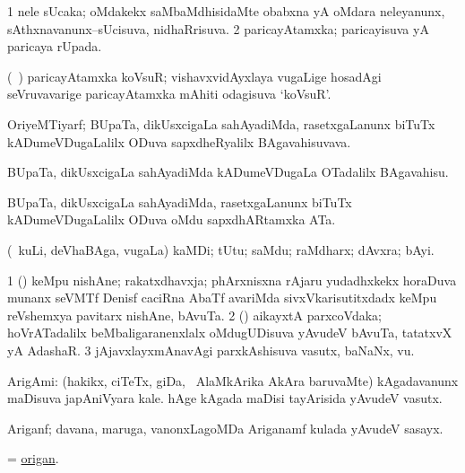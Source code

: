\bentry
{}
\gl{\gu}
\bmng
\bnum
\num{1} nele sUcaka; oMdakekx saMbaMdhisidaMte obabxna yA oMdara neleyanunx, sAthxnavanunx--sUcisuva, nidhaRrisuva. 
\num{2} paricayAtamxka; paricayisuva yA paricaya rUpada. 
\enum
\emng
\eentry

\bentry
{}
\gl{\nA}
\bmng
(\kanmu\ \ame) paricayAtamxka koVsuR; vishavxvidAyxlaya \mo vugaLige hosadAgi seVruvavarige paricayAtamxka mAhiti odagisuva `koVsuR'. 
\emng
\eentry

\bentry
{}
\gl{\nA}
\bmng
OriyeMTiyarf; BUpaTa, dikUsxcigaLa sahAyadiMda, rasetxgaLanunx biTuTx kADumeVDugaLalilx ODuva sapxdheRyalilx BAgavahisuvava. 
\emng
\eentry

\bentry
{}
\gl{\akirx}
\bmng
BUpaTa, dikUsxcigaLa sahAyadiMda kADumeVDugaLa OTadalilx BAgavahisu. 
\emng
\eentry

\bentry
{}
\gl{\nA}
\bmng
BUpaTa, dikUsxcigaLa sahAyadiMda, rasetxgaLanunx biTuTx kADumeVDugaLalilx ODuva oMdu sapxdhARtamxka ATa. 
\emng
\eentry

\bentry
{}
\gl{\nA}
\bmng
(\kanmu\ kuLi, deVhaBAga, \mo vugaLa) kaMDi; tUtu; saMdu; raMdharx; dAvxra; bAyi. 
\emng
\eentry

\bentry
{}
\gl{\nA}
\bmng
\bnum
\num{1} (\ca) keMpu nishAne; rakatxdhavxja; phArxnisxna rAjaru yudadhxkekx horaDuva munanx seVMTf Denisf caciRna AbaTf avariMda sivxVkarisutitxdadx keMpu reVshemxya pavitarx nishAne, bAvuTa. 
\num{2} (\rUpa) aikayxtA parxcoVdaka; hoVrATadalilx beMbaligaranenxlalx oMdugUDisuva yAvudeV bAvuTa, tatatxvX yA AdashaR. 
\num{3} jAjavxlayxmAnavAgi parxkAshisuva vasutx, baNaNx, \mo vu. 
\enum
\emng
\eentry

\bentry
{}
\gl{\nA}
\bmng
ArigAmi: 
\banum
{} (hakikx, ciTeTx, giDa, \mo\ AlaMkArika AkAra baruvaMte) kAgadavanunx maDisuva japAniVyara kale. 
 hAge kAgada maDisi tayArisida yAvudeV vasutx. 
\eanum
\emng
\eentry

\bentry
{}
\gl{\nA}
\bmng
Ariganf; davana, maruga, \mo vanonxLagoMDa Ariganamf kulada yAvudeV sasayx. 
\emng
\eentry

\bentry
{}
\gl{\nA}
\bmng
= \hyperlink{origan}{origan}. 
\emng
\eentry

